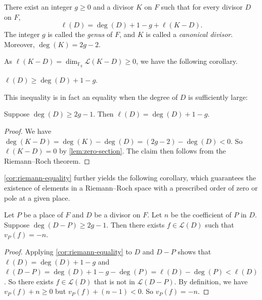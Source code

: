\documentclass[11pt]{article}
\newcommand{\F}{\mathbb{F}}
\begin{document}
\begin{theorem}\label{thm:RR}
There exist an integer $g\ge 0$ and a divisor $K$ on $F$ such that for every divisor
$D$ on $F$,
\[
\ell(D)=\deg(D)+1-g+\ell(K-D).
\]
The integer $g$ is called the \emph{genus} of $F$, and $K$ is called a
\emph{canonical divisor}. Moreover, $\deg(K)=2g-2$.
\end{theorem}

As $\ell(K-D)=\dim_{\F_q}\mathcal{L}(K-D)\geq 0$, we have the following corollary.

\begin{corollary}\label{cor:riemann}
$\ell(D)\geq \deg(D)+1-g$.
\end{corollary}

This inequality is in fact an equality when the degree of $D$ is sufficiently large:

\begin{corollary}\label{cor:riemann-equality}
Suppose $\deg(D)\geq 2g-1$. Then $\ell(D)=\deg(D)+1-g$. 
\end{corollary}
\begin{proof}
We have $\deg(K-D)=\deg(K)-\deg(D)=(2g-2)-\deg(D)<0$. So $\ell(K-D)=0$ by \cref{lem:zero-section}. The claim then follows from the Riemann--Roch theorem.
\end{proof}

\cref{cor:riemann-equality} further yields the following corollary, which guarantees the existence of elements in a Riemann–Roch space with a prescribed order of zero or pole at a given place.

\begin{corollary}\label{cor:existence-of-functions}
Let $P$ be a place of $F$ and $D$ be a divisor on $F$. Let $n$ be the coefficient of $P$ in $D$. 
Suppose $\deg(D-P)\geq 2g-1$. Then there exists $f\in\mathcal{L}(D)$ such that $v_P(f)=-n$.
\end{corollary}

\begin{proof}
Applying \cref{cor:riemann-equality} to $D$ and $D-P$ shows that $\ell(D)=\deg(D)+1-g$ and $\ell(D-P)=\deg(D)+1-g-\deg(P)=\ell(D)-\deg(P)<\ell(D)$.
So there exists $f\in \mathcal{L}(D)$ that is not in $\mathcal{L}(D-P)$.
By definition, we have $v_P(f)+n\geq 0$ but $v_P(f)+(n-1)<0$. So $v_P(f)=-n$.
\end{proof}
\end{document}
